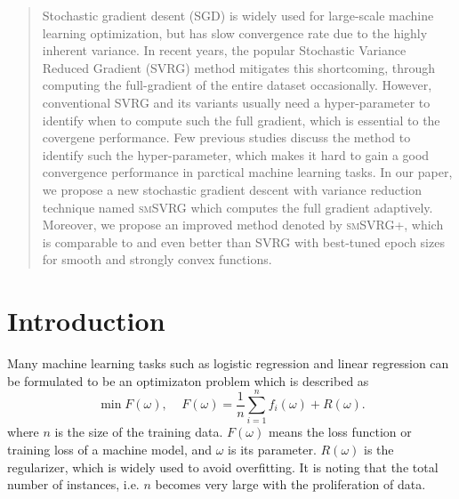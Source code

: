 \documentclass[conference]{IEEEtran}
\begin{document}

\maketitle

\begin{abstract}
    Stochastic gradient desent (SGD) is widely used for large-scale machine learning optimization, but has slow convergence rate due to the highly inherent variance. In recent years, the popular Stochastic Variance Reduced Gradient (SVRG) method mitigates this shortcoming, through computing the full-gradient of the entire dataset occasionally. However, conventional SVRG and its variants usually need a hyper-parameter to identify when to compute such the full gradient, which is essential to the covergene performance. Few previous studies discuss the method to identify such the hyper-parameter, which makes it hard to gain a good convergence performance in parctical machine learning tasks.  In our paper, we propose a new stochastic gradient descent with variance reduction technique named \textsc{smSVRG} which computes the full gradient adaptively.  Moreover, we propose an improved method denoted by \textsc{smSVRG+}, which is comparable to and even better than SVRG with best-tuned epoch sizes for smooth and strongly convex functions.


\end{abstract}


%
\IEEEpeerreviewmaketitle



\section{Introduction}
Many machine learning tasks such as logistic regression and linear regression can be formulated to be an optimizaton problem which is described as 
\begin{equation}
\label{equa_loss_minimization}
\min F(\omega),~~~~~F(\omega)=\frac{1}{n}\sum\limits_{i=1}^n f_i(\omega)+R(\omega).
\end{equation}
where $n$ is the size of the training data. $F(\omega)$ means the loss function or training loss of a machine model, and $\omega$ is its parameter. $R(\omega)$ is the regularizer, which is widely used to avoid overfitting. It is noting that the total number of instances, i.e. $n$ becomes very large with the proliferation of data. 
\end{document}
